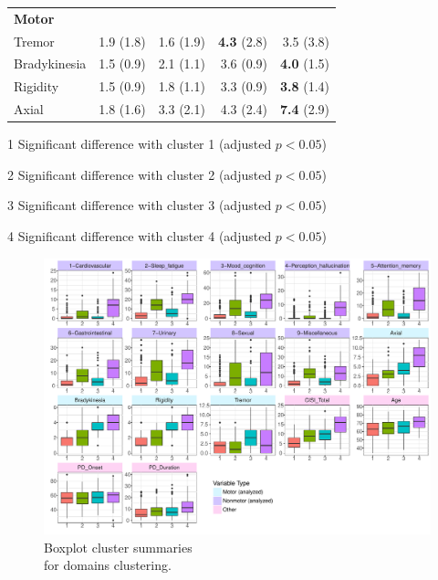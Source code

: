 \documentclass[preprint,5p]{elsarticle} %
\begin{document}
\begin{table}[t]
\begin{threeparttable}
\begin{tabular}{l r r r r}
    \midrule
    \textbf{Motor} & & & & \\
    Tremor & 1.9 (1.8)\tnote{34} & 1.6 (1.9)\tnote{34} & \textbf{4.3} (2.8)\tnote{124} & 3.5
    (3.8)\tnote{123} \\
    Bradykinesia & 1.5 (0.9)\tnote{234} & 2.1 (1.1)\tnote{134} & 3.6 (0.9)\tnote{124} &
    \textbf{4.0} (1.5)\tnote{123} \\
    Rigidity & 1.5 (0.9)\tnote{234} & 1.8 (1.1)\tnote{134} & 3.3 (0.9)\tnote{124} &
    \textbf{3.8} (1.4)\tnote{123} \\
    Axial & 1.8 (1.6)\tnote{234} & 3.3 (2.1)\tnote{134} & 4.3 (2.4)\tnote{124} &
    \textbf{7.4} (2.9)\tnote{123} \\
    \bottomrule
  \end{tabular}
  \begin{tablenotes}
    \small
    \item[1] Significant difference with cluster 1 (adjusted $p < 0.05$)
    \item[2] Significant difference with cluster 2 (adjusted $p < 0.05$)
    \item[3] Significant difference with cluster 3 (adjusted $p < 0.05$)
    \item[4] Significant difference with cluster 4 (adjusted $p < 0.05$)
  \end{tablenotes}
  \end{threeparttable}
\end{table}

\begin{figure}[b]
  \centering
  \includegraphics[width=\linewidth]{kmeans-summaries-4-pub.pdf}
  \vspace{-7.5em}
  \captionsetup{justification=raggedleft,
    singlelinecheck=false
  }
  \caption{Boxplot cluster summaries \\ for domains clustering.}
  \label{fig:box}
\end{figure}
\end{document}
